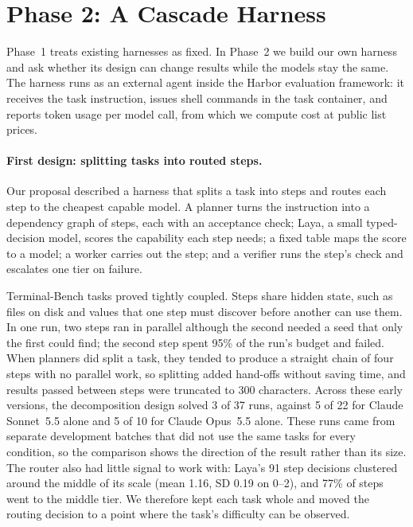 \section{Phase 2: A Cascade Harness}
\label{sec:p2method}

Phase~1 treats existing harnesses as fixed. In Phase~2 we build our own harness and ask whether its design can
change results while the models stay the same. The harness runs as an external agent inside the Harbor
evaluation framework: it receives the task instruction, issues shell commands in the task container, and reports
token usage per model call, from which we compute cost at public list prices.

\paragraph{First design: splitting tasks into routed steps.}
Our proposal described a harness that splits a task into steps and routes each step to the cheapest capable
model. A planner turns the instruction into a dependency graph of steps, each with an acceptance check; Laya, a
small typed-decision model, scores the capability each step needs; a fixed table maps the score to a model; a
worker carries out the step; and a verifier runs the step's check and escalates one tier on failure.

Terminal-Bench tasks proved tightly coupled. Steps share hidden state, such as files on disk and values that one
step must discover before another can use them. In one run, two steps ran in parallel although the second needed
a seed that only the first could find; the second step spent 95\% of the run's budget and failed. When planners
did split a task, they tended to produce a straight chain of four steps with no parallel work, so splitting added
hand-offs without saving time, and results passed between steps were truncated to 300 characters. Across these
early versions, the decomposition design solved 3 of 37 runs, against 5 of 22 for Claude Sonnet~5.5 alone and
5 of 10 for Claude Opus~5.5 alone. These runs came from separate development batches that did not use the same
tasks for every condition, so the comparison shows the direction of the result rather than its size. The router also had little signal to work with: Laya's 91 step decisions
clustered around the middle of its scale (mean 1.16, SD 0.19 on 0--2), and 77\% of steps went to the middle tier.
We therefore kept each task whole and moved the routing decision to a point where the task's difficulty can be
observed.


